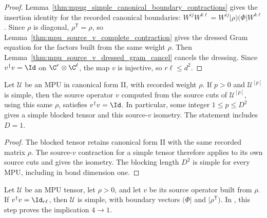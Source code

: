 \begin{proof}\leanok
    Lemma~\ref{thm:mpug_simple_canonical_boundary_contractions} gives
    the insertion identity for the recorded canonical boundaries:
    $W^{ij}W^{k\ell}=W^{ij}\lvert\rho)(\Phi\rvert W^{k\ell}$. Since $\rho$
    is diagonal, $\rho^{\mathsf T}=\rho$, so
    Lemma~\ref{thm:mpu_source_v_complete_contraction} gives the dressed Gram
    equation for the factors built from the same weight $\rho$. Then
    Lemma~\ref{thm:mpu_source_v_dressed_gram_cancel} cancels the dressing. Since $v^\dagger v=\Id$ on
    $\C^r\otimes\C^\ell$, the map $v$ is injective, so $r\ell\le d^2$.
\end{proof}

\begin{lemma}
    \label{thm:mpu_source_v_isometry_after_blocking}
    \leanok
    Let $\mathcal U$ be an MPU in canonical form II, with recorded weight
    $\rho$. If $p>0$ and $\mathcal U^{[p]}$ is simple, then the source operator
    $v$ computed from the source cuts of $\mathcal U^{[p]}$, using this same
    $\rho$, satisfies $v^\dagger v=\Id$. In particular, some integer
    $1\leq p\leq D^2$ gives a simple blocked tensor and this source-$v$
    isometry. The statement includes $D=1$.
\end{lemma}

\begin{proof}\leanok
    The blocked tensor retains canonical form II with the same recorded
    matrix $\rho$. The source-$v$ contraction for a simple tensor therefore
    applies to its own source cuts and gives the isometry. The blocking
    length $D^2$ is simple for every MPU, including in bond dimension one.
\end{proof}

\begin{lemma}
    \label{thm:mpu_simple_of_source_v_isometry}
    \leanok
    Let $\mathcal U$ be an MPU tensor, let $\rho>0$, and let $v$ be its
    source operator built from $\rho$. If $v^\dagger v=\Id_{r\ell}$, then
    $\mathcal U$ is simple, with boundary vectors $(\Phi\rvert$ and
    $\lvert\rho^{\mathsf T})$. In \cite[proof of Theorem~III.8]{Cirac2017MPU}, this step proves the implication
    $4\to1$.
\end{lemma}

